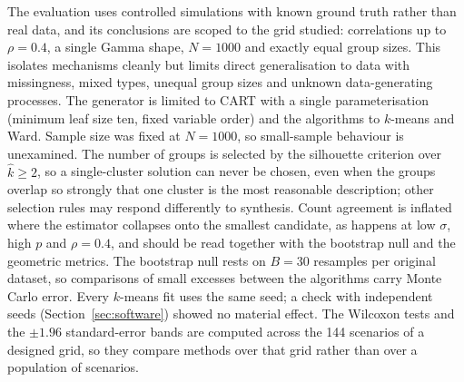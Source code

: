 \documentclass[pdflatex,referee]{sn-jnl}
\begin{document}
The evaluation uses controlled simulations with known ground truth rather than
real data, and its conclusions are scoped to the grid studied: correlations up
to $\rho = 0.4$, a single Gamma shape, $N = 1000$ and exactly equal group
sizes. This isolates mechanisms cleanly but limits direct generalisation to
data with missingness, mixed types, unequal group sizes and unknown
data-generating processes. The generator is limited to CART with a single
parameterisation (minimum leaf size ten, fixed variable order) and the
algorithms to $k$-means and Ward. Sample size was fixed at $N = 1000$, so
small-sample behaviour is unexamined. The number of groups is selected by the
silhouette criterion over $\hat{k} \ge 2$, so a single-cluster solution can
never be chosen, even when the groups overlap so strongly that one cluster is
the most reasonable description; other selection rules \citep{milligan1985}
may respond differently to synthesis. Count agreement is inflated where the
estimator collapses onto the smallest candidate, as happens at low $\sigma$,
high $p$ and $\rho = 0.4$, and should be read together with the bootstrap null
and the geometric metrics. The bootstrap null rests on $B = 30$ resamples per
original dataset, so comparisons of small excesses between the algorithms
carry Monte Carlo error. Every $k$-means fit uses the same seed; a check with
independent seeds (Section~\ref{sec:software}) showed no material effect. The Wilcoxon tests
and the $\pm 1.96$ standard-error bands are computed across the 144 scenarios
of a designed grid, so they compare methods over that grid rather than over a
population of scenarios.
\end{document}
